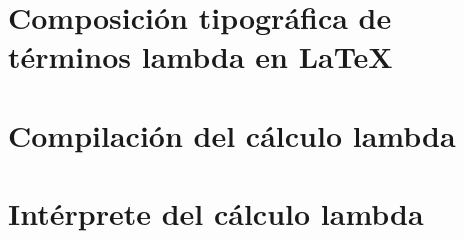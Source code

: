 \documentclass[12pt]{tesislcc}
\begin{document}
\conclusiones%



\appendix

\chapter{Composición tipográfica de términos lambda en \LaTeX}


\chapter{Compilación del cálculo lambda}


\chapter{Intérprete del cálculo lambda}


\listoffigures
\listoftables
\listofalgorithms%
\listoflistings%

\nocite{*}

\end{document}
